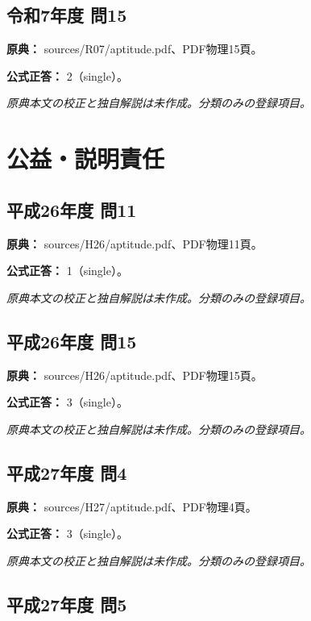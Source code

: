 \subsection{令和7年度 問15}
\label{q:r07-reg-apt-15}

\noindent\textbf{原典：} sources/R07/aptitude.pdf、PDF物理15頁。

\textbf{公式正答：} 2（single）。

\par\textit{原典本文の校正と独自解説は未作成。分類のみの登録項目。}

\section{公益・説明責任}

\subsection{平成26年度 問11}
\label{q:h26-reg-apt-11}

\noindent\textbf{原典：} sources/H26/aptitude.pdf、PDF物理11頁。

\textbf{公式正答：} 1（single）。

\par\textit{原典本文の校正と独自解説は未作成。分類のみの登録項目。}

\subsection{平成26年度 問15}
\label{q:h26-reg-apt-15}

\noindent\textbf{原典：} sources/H26/aptitude.pdf、PDF物理15頁。

\textbf{公式正答：} 3（single）。

\par\textit{原典本文の校正と独自解説は未作成。分類のみの登録項目。}

\subsection{平成27年度 問4}
\label{q:h27-reg-apt-04}

\noindent\textbf{原典：} sources/H27/aptitude.pdf、PDF物理4頁。

\textbf{公式正答：} 3（single）。

\par\textit{原典本文の校正と独自解説は未作成。分類のみの登録項目。}

\subsection{平成27年度 問5}
\label{q:h27-reg-apt-05}


